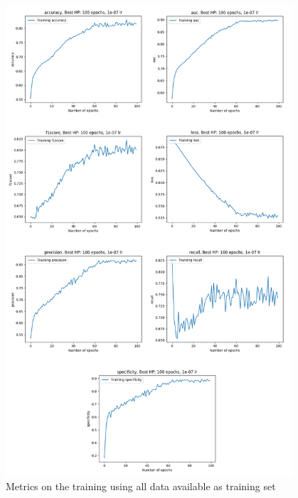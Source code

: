 \begin{figure}[!h]
\centering
\includegraphics[width=0.95\textwidth, keepaspectratio=true]{./figures/paper_reproduction_results_challenge_full_dataset.png}
\caption{Metrics on the training using all data available as training set}
\label{fig:challenge_all_results_experiment}
\end{figure}

\begin{table}[!t]
\caption{AUC of the model saved at different epochs on the official SPIE-AAPM-NCI Prostate MR classification test set }
\label{fig:results_for_all_models_challenge}
\end{table}

